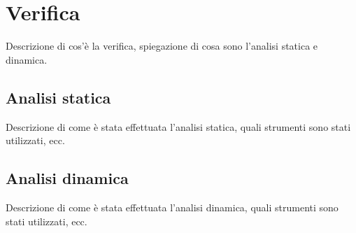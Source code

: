 \section{Verifica}
\label{sez:verifica}

Descrizione di cos'è la verifica, spiegazione di cosa sono l'analisi statica e dinamica.\\

\subsection{Analisi statica}
\label{subsec:analisi-statica}

Descrizione di come è stata effettuata l'analisi statica, quali strumenti sono stati utilizzati, ecc.\\

\subsection{Analisi dinamica}
\label{subsec:analisi-dinamica}

Descrizione di come è stata effettuata l'analisi dinamica, quali strumenti sono stati utilizzati, ecc.\\